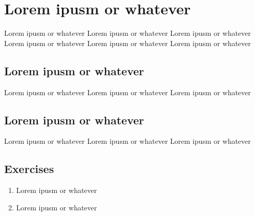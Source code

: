 \chapter{Lorem ipusm or whatever}
\label{chap:reference-frames}

Lorem ipusm or whatever Lorem ipusm or whatever Lorem ipusm or whatever 
Lorem ipusm or whatever Lorem ipusm or whatever Lorem ipusm or whatever

\section{Lorem ipusm or whatever}
\label{sec:reference-frames-overview}

Lorem ipusm or whatever Lorem ipusm or whatever Lorem ipusm or whatever

\section{Lorem ipusm or whatever}

Lorem ipusm or whatever Lorem ipusm or whatever Lorem ipusm or whatever

\section{Exercises}

\begin{enumerate}
    \item Lorem ipusm or whatever
    \item Lorem ipusm or whatever
\end{enumerate}

